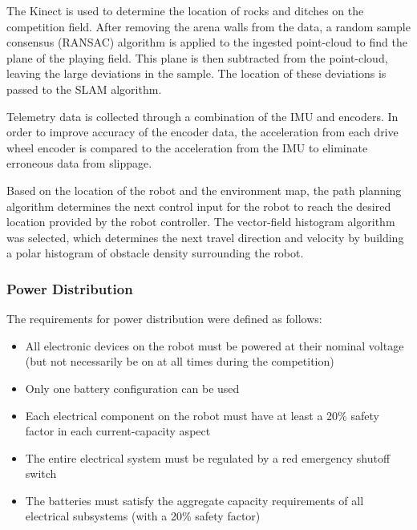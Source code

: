 \documentclass[class=article, crop=false]{standalone}
\begin{document}
	The Kinect is used to determine the location of rocks and ditches on the competition field. After removing the arena walls from the data, a random sample consensus (RANSAC) algorithm is applied to the ingested point-cloud to find the plane of the playing field. This plane is then subtracted from the point-cloud, leaving the large deviations in the sample. The location of these deviations is passed to the SLAM algorithm.

	Telemetry data is collected through a combination of the IMU and encoders. In order to improve accuracy of the encoder data, the acceleration from each drive wheel encoder is compared to the acceleration from the IMU to eliminate erroneous data from slippage.
	
	Based on the location of the robot and the environment map, the path planning algorithm determines the next control input for the robot to reach the desired location provided by the robot controller. The vector-field histogram algorithm was selected, which determines the next travel direction and velocity by building a polar histogram of obstacle density surrounding the robot.

	
	\subsubsection{Power Distribution}
	
	The requirements for power distribution were defined as follows:
	\begin{itemize}
	 \item All electronic devices on the robot must be powered at their nominal voltage (but not necessarily be on at all times during the competition)
	 \item Only one battery configuration can be used
	 \item Each electrical component on the robot must have at least a 20\% safety factor in each current-capacity aspect
	 \item The entire electrical system must be regulated by a red emergency shutoff switch
	 \item The batteries must satisfy the aggregate capacity requirements of all electrical subsystems (with a 20\% safety factor)
	\end{itemize}
	
\end{document}
